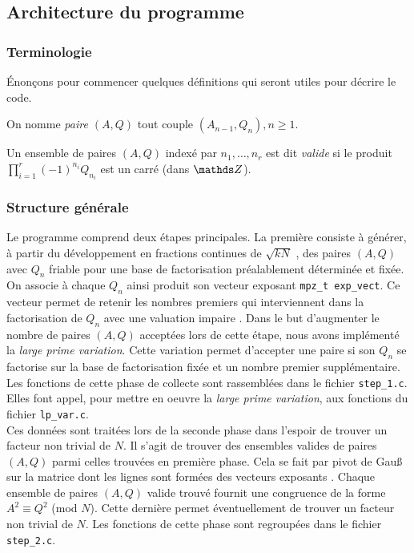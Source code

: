 \subsection{Architecture du programme}

\subsubsection{Terminologie}

Énonçons pour commencer quelques définitions qui seront utiles pour décrire le
code. 

\begin{definition}
	On nomme \emph{paire $(A, Q)$} tout couple $(A_{n-1}, Q_n), n\geq 1$.
\end{definition}

\begin{definition}
	Un ensemble de paires $(A, Q)$ indexé par $n_1, \dots, n_r$ est dit
	\emph{valide} si le produit $\prod_{i=1}^r (-1)^{n_i} Q_{n_i}$ est un carré
	(dans $\Z$).
\end{definition}

\subsubsection{Structure générale}

Le programme comprend deux étapes principales. La première consiste à générer,
à partir du développement en fractions continues de $\sqrt{kN}$ , des paires $(A, Q)$ avec $Q_n$ friable pour une base de factorisation
préalablement déterminée et fixée. On associe à chaque $Q_n$ ainsi produit son
vecteur exposant \texttt{mpz\_t exp\_vect}. Ce vecteur permet de retenir les
nombres premiers qui interviennent dans la factorisation de $Q_n$ avec une
valuation impaire . Dans le but d'augmenter le nombre de paires $(A,Q)$
acceptées lors de cette étape, nous avons implémenté la \textit{large prime
variation}. Cette variation permet d'accepter une paire si son $Q_n$ se
factorise sur la base de factorisation fixée et un nombre premier
supplémentaire. Les fonctions de cette phase de collecte sont rassemblées dans
le fichier \texttt{step\_1.c}. Elles font appel, pour mettre en oeuvre la
\textit{large prime variation}, aux fonctions du fichier \texttt{lp\_var.c}. \\
 
Ces données sont traitées lors de la seconde phase dans l'espoir de trouver un
facteur non trivial de $N$. Il s'agit de trouver des ensembles valides de
paires $(A, Q)$ parmi celles trouvées en première phase. Cela se fait par pivot
de Gau\ss{} sur la matrice dont les lignes sont formées des vecteurs exposants
. Chaque ensemble de paires $(A, Q)$ valide trouvé fournit une
congruence de la forme $A^2 \equiv Q^2$ (mod $N$). Cette dernière permet
éventuellement de trouver un facteur non trivial de $N$. Les fonctions de cette
phase sont regroupées dans le fichier \texttt{step\_2.c}. \\

